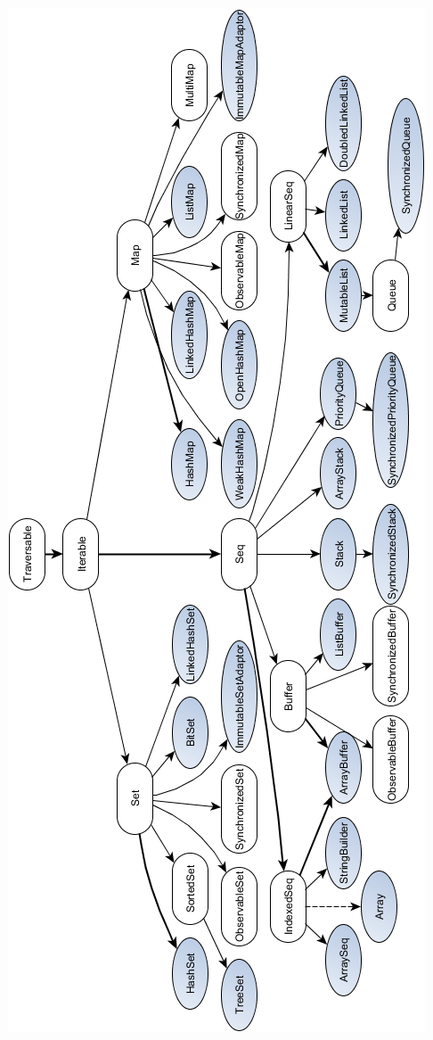 \documentclass[a4paper,twoside,10pt,landscape]{article}
\begin{document}
\begin{multicols}{3}
\begin{center}
    \includegraphics[scale=.60]{scala-collection-mutable.png}
    \label{fig:scala-collection-mutable}
\end{center}



\end{multicols}
\end{document}

